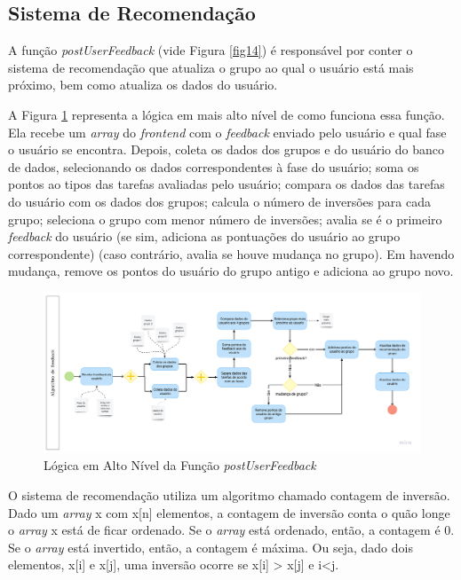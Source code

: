 \subsection{Sistema de Recomendação}
\label{sr}

A função \emph{postUserFeedback} (vide Figura \ref{fig14}) é responsável por conter o sistema de 
recomendação que atualiza o grupo ao qual o usuário está mais próximo, bem como atualiza os dados do usuário. 

A Figura \ref{fig15} representa a lógica em mais alto nível de como funciona essa função. Ela recebe 
um \emph{array} do \emph{frontend} com o \emph{feedback} enviado pelo usuário e qual fase o usuário se encontra. 
Depois, coleta os dados dos grupos e do usuário do banco de dados, selecionando os dados correspondentes à fase 
do usuário; soma os pontos ao tipos das tarefas avaliadas pelo usuário; compara os dados das tarefas do usuário 
com os dados dos grupos; calcula o número de inversões para cada grupo; seleciona o grupo com menor 
número de inversões; avalia se é o primeiro \emph{feedback} do usuário (se sim, adiciona as pontuações do usuário ao grupo correspondente) 
(caso contrário, avalia se houve mudança no grupo). Em havendo mudança, remove os pontos do usuário do grupo antigo e adiciona ao grupo novo. 

\begin{figure}[ht]
	\caption{Lógica em Alto Nível da Função \emph{postUserFeedback }}
	\begin{center}
	\includegraphics[keepaspectratio=true,scale=0.14]{figuras/recomendacao.png}
	\end{center}
    \label{fig15}
\end{figure}

O sistema de recomendação utiliza um algoritmo chamado contagem de inversão. 
Dado um \emph{array} x com x[n] elementos, a contagem de inversão conta o quão longe o \emph{array} x está de ficar 
ordenado. Se o \emph{array} está ordenado, então, a contagem é 0. Se o \emph{array} está invertido, 
então, a contagem é máxima. Ou seja, dado dois elementos, x[i] e x[j], uma 
inversão ocorre se x[i] > x[j] e i<j.

